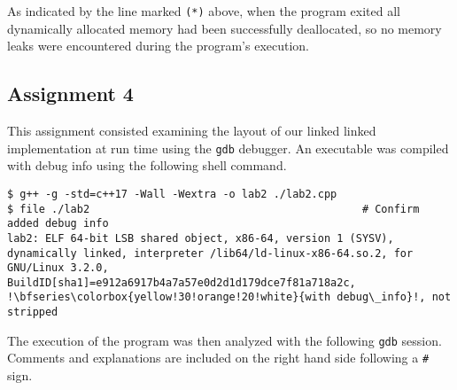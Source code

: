 \documentclass[11pt, letterpaper]{article} %
\begin{document}
As indicated by the line marked \texttt{(*)} above, when the program exited all dynamically allocated memory had been successfully deallocated, so no memory leaks were encountered during the program's execution.

\subsection*{Assignment 4}

This assignment consisted examining the layout of our linked linked implementation at run time using the \texttt{gdb} debugger. An executable was compiled with debug info using the following shell command.
\begin{lstlisting}[style=labreportstyle-sh,escapechar=!]
$ g++ -g -std=c++17 -Wall -Wextra -o lab2 ./lab2.cpp
$ file ./lab2                                           # Confirm added debug info
lab2: ELF 64-bit LSB shared object, x86-64, version 1 (SYSV), dynamically linked, interpreter /lib64/ld-linux-x86-64.so.2, for GNU/Linux 3.2.0, BuildID[sha1]=e912a6917b4a7a57e0d2d1d179dce7f81a718a2c, !\bfseries\colorbox{yellow!30!orange!20!white}{with debug\_info}!, not stripped
\end{lstlisting}
The execution of the program was then analyzed with the following \texttt{gdb} session. Comments and explanations are included on the right hand side following a \texttt{\#} sign.
\end{document}
